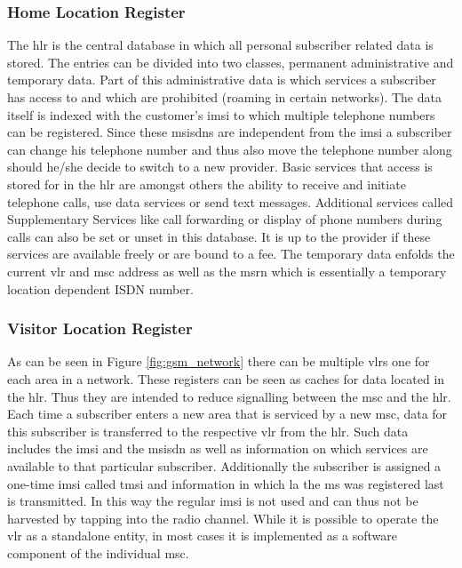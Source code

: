 \subsubsection{Home Location Register}
The \gls{hlr} is the central database in which all personal subscriber related data is stored.
The entries can be divided into two classes, permanent administrative and temporary data.
Part of this administrative data is which services a subscriber has access to and which are prohibited (\eg roaming in certain networks).
The data itself is indexed with the customer's \gls{imsi} to which multiple telephone numbers can be registered.
Since these \glspl{msisdn} are independent from the \gls{imsi} a subscriber can change his telephone number and thus also move the telephone number along should he/she decide to switch to a new provider.
Basic services that access is stored for in the \gls{hlr} are amongst others the ability to receive and initiate telephone calls, use data services or send text messages.
Additional services called Supplementary Services like call forwarding or display of phone numbers during calls can also be set or unset in this database.
It is up to the provider if these services are available freely or are bound to a fee.
The temporary data enfolds the current \gls{vlr} and \gls{msc} address as well as the \gls{msrn} which is essentially a temporary location dependent ISDN number.

\subsubsection{Visitor Location Register}
As can be seen in Figure \ref{fig:gsm_network} there can be multiple \glspl{vlr} one for each area in a network.
These registers can be seen as caches for data located in the \gls{hlr}.
Thus they are intended to reduce signalling between the \gls{msc} and the \gls{hlr}.
Each time a subscriber enters a new area that is serviced by a new \gls{msc}, data for this subscriber is transferred to the respective \gls{vlr} from the \gls{hlr}.
Such data includes the \gls{imsi} and the \gls{msisdn} as well as information on which services are available to that particular subscriber.
Additionally the subscriber is assigned a one-time \gls{imsi} called \gls{tmsi} and information in which \gls{la} the \gls{ms} was registered last is transmitted.
In this way the regular \gls{imsi} is not used and can thus not be harvested by tapping into the radio channel.
While it is possible to operate the \gls{vlr} as a standalone entity, in most cases it is implemented as a software component of the individual \gls{msc}.

